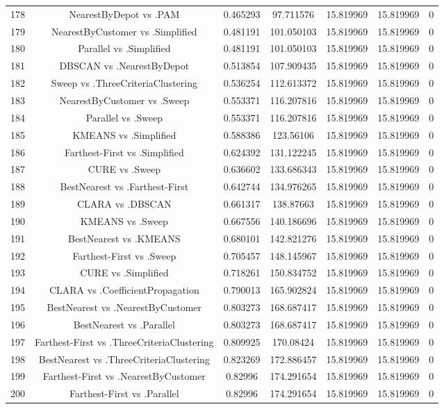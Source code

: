 \documentclass[a4paper,10pt]{article}
\begin{document}
\begin{landscape}
\begin{table}[!htp]
\begin{tabular}{ccccccc}
178&NearestByDepot vs .PAM&0.465293&97.711576&15.819969&15.819969&0\\
179&NearestByCustomer vs .Simplified&0.481191&101.050103&15.819969&15.819969&0\\
180&Parallel vs .Simplified&0.481191&101.050103&15.819969&15.819969&0\\
181&DBSCAN vs .NearestByDepot&0.513854&107.909435&15.819969&15.819969&0\\
182&Sweep vs .ThreeCriteriaClustering&0.536254&112.613372&15.819969&15.819969&0\\
183&NearestByCustomer vs .Sweep&0.553371&116.207816&15.819969&15.819969&0\\
184&Parallel vs .Sweep&0.553371&116.207816&15.819969&15.819969&0\\
185&KMEANS vs .Simplified&0.588386&123.56106&15.819969&15.819969&0\\
186&Farthest-First vs .Simplified&0.624392&131.122245&15.819969&15.819969&0\\
187&CURE vs .Sweep&0.636602&133.686343&15.819969&15.819969&0\\
188&BestNearest vs .Farthest-First&0.642744&134.976265&15.819969&15.819969&0\\
189&CLARA vs .DBSCAN&0.661317&138.87663&15.819969&15.819969&0\\
190&KMEANS vs .Sweep&0.667556&140.186696&15.819969&15.819969&0\\
191&BestNearest vs .KMEANS&0.680101&142.821276&15.819969&15.819969&0\\
192&Farthest-First vs .Sweep&0.705457&148.145967&15.819969&15.819969&0\\
193&CURE vs .Simplified&0.718261&150.834752&15.819969&15.819969&0\\
194&CLARA vs .CoefficientPropagation&0.790013&165.902824&15.819969&15.819969&0\\
195&BestNearest vs .NearestByCustomer&0.803273&168.687417&15.819969&15.819969&0\\
196&BestNearest vs .Parallel&0.803273&168.687417&15.819969&15.819969&0\\
197&Farthest-First vs .ThreeCriteriaClustering&0.809925&170.08424&15.819969&15.819969&0\\
198&BestNearest vs .ThreeCriteriaClustering&0.823269&172.886457&15.819969&15.819969&0\\
199&Farthest-First vs .NearestByCustomer&0.82996&174.291654&15.819969&15.819969&0\\
200&Farthest-First vs .Parallel&0.82996&174.291654&15.819969&15.819969&0\\

\end{tabular}
\end{table}
\end{landscape}
\end{document}
